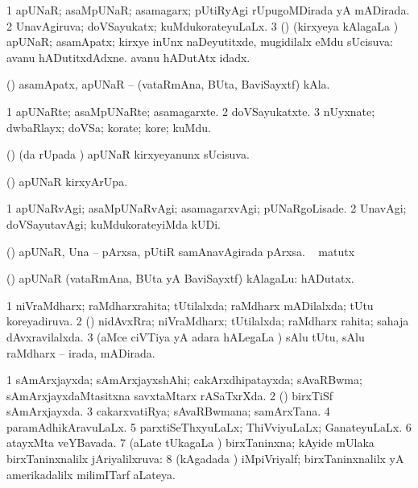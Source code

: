 \bentry
{}
\gl{\gu}
\bmng
\bnum
\num{1} apUNaR; asaMpUNaR; asamagarx; pUtiRyAgi rUpugoMDirada yA mADirada. 
\num{2} UnavAgiruva; doVSayukatx; kuMdukorateyuLaLx. 
\num{3} (\vAyx) (kirxyeya kAlagaLa \vi) apUNaR; asamApatx; kirxye inUnx naDeyutitxde, mugidilalx eMdu sUcisuva:  avanu hADutitxdAdxne.  avanu hADutAtx idadx. 
\enum
\emng
\eentry

\bentry
{}
\gl{\nA}
\bmng
(\vAyx) asamApatx, apUNaR -- (vataRmAna, BUta, BaviSayxtf) kAla. 
\emng
\eentry

\bentry
{}
\gl{\nA}
\bmng
\bnum
\num{1} apUNaRte; asaMpUNaRte; asamagarxte. 
\num{2} doVSayukatxte. 
\num{3} nUyxnate; dwbaRlayx; doVSa; korate; kore; kuMdu. 
\enum
\emng
\eentry

\bentry
{}
\gl{\gu}
\bmng
(\vAyx) (\kirx da rUpada \vi) apUNaR kirxyeyanunx sUcisuva. 
\emng
\eentry

\bentry
{}
\gl{\nA}
\bmng
(\vAyx) apUNaR kirxyArUpa. 
\emng
\eentry

\bentry
{}
\gl{\kirxvi}
\bmng
\bnum
\num{1} apUNaRvAgi; asaMpUNaRvAgi; asamagarxvAgi; pUNaRgoLisade. 
\num{2} UnavAgi; doVSayutavAgi; kuMdukorateyiMda kUDi. 
\enum
\emng
\eentry

\bentry
{}
\gl{\nA}
\bmng
(\CaM) apUNaR, Una -- pArxsa, pUtiR samAnavAgirada pArxsa. \udA\  matutx  
\emng
\eentry

\bentry
{}
\gl{\nA}
\bmng
(\vAyx) apUNaR (vataRmAna, BUta yA BaviSayxtf) kAlagaLu:  hADutatx. 
\emng
\eentry

\bentry
{}
\gl{\gu}
\bmng
\bnum
\num{1} niVraMdharx; raMdharxrahita; tUtilalxda; raMdharx mADilalxda; tUtu koreyadiruva. 
\num{2} (\aMrashA) nidAvxRra; niVraMdharx; tUtilalxda; raMdharx rahita; sahaja dAvxravilalxda. 
\num{3} (aMce ciVTiya yA adara hALegaLa \vi) sAlu tUtu, sAlu raMdharx -- irada, mADirada. 
\enum
\emng
\eentry

\bentry
{}
\gl{\gu}
\bmng
\bnum
\num{1} sAmArxjayxda; sAmArxjayxshAhi; cakArxdhipatayxda; sAvaRBwma; sAmArxjayxdaMtasitxna savxtaMtarx rASaTxrXda. 
\num{2} (\ca) birxTiSf sAmArxjayxda. 
\num{3} cakarxvatiRya; sAvaRBwmana; samArxTana. 
\num{4} paramAdhikAravuLaLx. 
\num{5} parxtiSeThxyuLaLx; ThiVviyuLaLx; GanateyuLaLx. 
\num{6} atayxMta veYBavada. 
\num{7} (aLate tUkagaLa \vi) birxTaninxna; kAyide mUlaka birxTaninxnalilx jAriyalilxruva:  
\num{8} (kAgadada \vi) iMpiVriyalf; birxTaninxnalilx  yA amerikadalilx  milimITarf aLateya. 
\enum
\emng
\eentry

